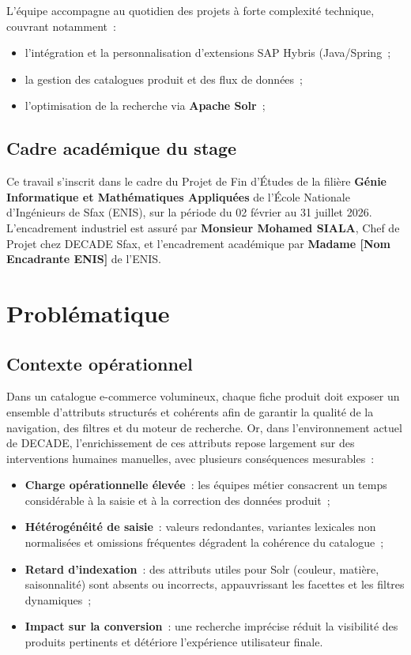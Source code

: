 L'équipe accompagne au quotidien des projets à forte complexité technique, couvrant notamment~:
\begin{itemize}
  \item l'intégration et la personnalisation d'extensions SAP Hybris (Java/Spring~;
  \item la gestion des catalogues produit et des flux de données~;
  \item l'optimisation de la recherche via \textbf{Apache Solr}~;
\end{itemize}

\subsection{Cadre académique du stage}
Ce travail s'inscrit dans le cadre du Projet de Fin d'Études de la filière \textbf{Génie Informatique et Mathématiques Appliquées} de l'École Nationale d'Ingénieurs de Sfax (ENIS), sur la période du 02 février au 31 juillet 2026. L'encadrement industriel est assuré par \textbf{Monsieur Mohamed SIALA}, Chef de Projet chez DECADE Sfax, et l'encadrement académique par \textbf{Madame [Nom Encadrante ENIS]} de l'ENIS.

\section{Problématique}

\subsection{Contexte opérationnel}
Dans un catalogue e-commerce volumineux, chaque fiche produit doit exposer un ensemble d'attributs structurés et cohérents afin de garantir la qualité de la navigation, des filtres et du moteur de recherche. Or, dans l'environnement actuel de DECADE, l'enrichissement de ces attributs repose largement sur des interventions humaines manuelles, avec plusieurs conséquences mesurables~:

\begin{itemize}
  \item \textbf{Charge opérationnelle élevée}~: les équipes métier consacrent un temps considérable à la saisie et à la correction des données produit~;
  \item \textbf{Hétérogénéité de saisie}~: valeurs redondantes, variantes lexicales non normalisées et omissions fréquentes dégradent la cohérence du catalogue~;
  \item \textbf{Retard d'indexation}~: des attributs utiles pour Solr (couleur, matière, saisonnalité) sont absents ou incorrects, appauvrissant les facettes et les filtres dynamiques~;
  \item \textbf{Impact sur la conversion}~: une recherche imprécise réduit la visibilité des produits pertinents et détériore l'expérience utilisateur finale.
\end{itemize}

